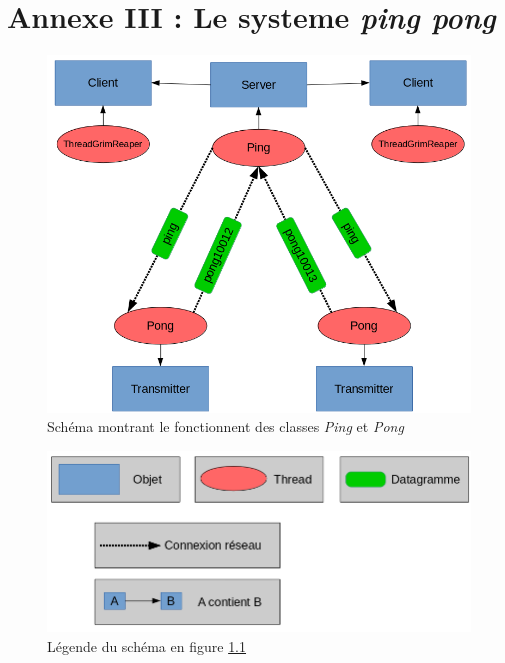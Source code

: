 \documentclass[a4paper, titlepage]{livret}
\begin{document}
  \chapter{Annexe III : Le systeme \textit{ping pong}}
\begin{figure}[th]
      \begin{center}
        \includegraphics[scale=0.4]{Assets/s_r_3.png}
        \caption{Schéma montrant le fonctionnent des classes \textit{Ping} et \textit{Pong}}
        \label{pingpongschema}
      \end{center}
\end{figure}

\begin{figure}[th]
      \begin{center}
        \includegraphics[scale=0.25]{Assets/l_r_3.png}
        \caption{Légende du schéma en figure \ref{pingpongschema}}
        \label{pingpongschemalegende}
      \end{center}
\end{figure}
\listoffigures
\listoftables
\end{document}
